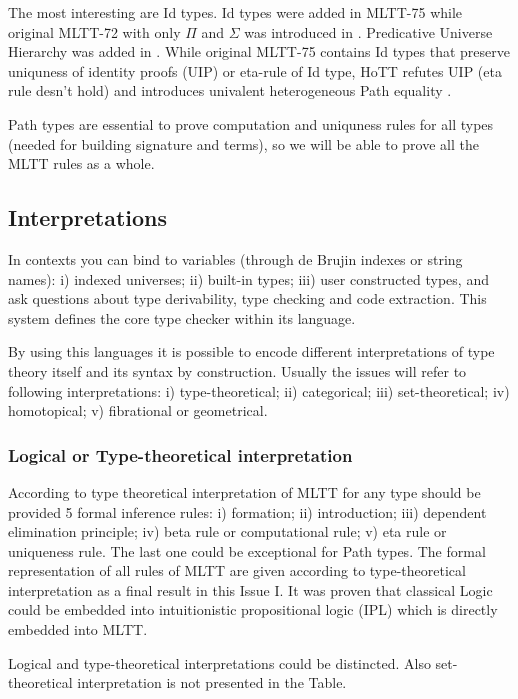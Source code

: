 \documentclass{article}
\theoremstyle{definition}
\begin{document}
The most interesting are Id types. Id types were added in MLTT-75 \cite{Lof84} while original MLTT-72
with only $\Pi$ and $\Sigma$ was introduced in \cite{Lof72}.
Predicative Universe Hierarchy was added in \cite{Lof75}.
While original MLTT-75 contains Id types that preserve uniquness of identity
proofs (UIP) or eta-rule of Id type, HoTT refutes UIP (eta rule desn't hold)
and introduces univalent heterogeneous Path equality \cite{Hofmann96}.

Path types are essential to prove computation and uniquness rules for all types
(needed for building signature and terms), so we will be able to prove all
the MLTT rules as a whole.

\subsection{Interpretations}

In contexts you can bind to variables (through de Brujin indexes or string names):
i) indexed universes; ii) built-in types; iii) user constructed types, and ask
questions about type derivability, type checking and code extraction. This system
defines the core type checker within its language.

By using this languages it is possible to encode different interpretations of
type theory itself and its syntax by construction. Usually the issues will refer to
following interpretations: i) type-theoretical; ii) categorical;
iii) set-theoretical; iv) homotopical; v) fibrational or geometrical.

\subsubsection{Logical or Type-theoretical interpretation}

According to type theoretical interpretation of MLTT for any type should be provided 5 formal
inference rules: i) formation; ii) introduction; iii) dependent elimination principle;
iv) beta rule or computational rule; v) eta rule or uniqueness rule. The last one could
be exceptional for Path types. The formal representation of all rules of MLTT
are given according to type-theoretical interpretation as a final result in this Issue I.
It was proven that classical Logic could be embedded into
intuitionistic propositional logic (IPL) which is directly embedded into MLTT.

Logical and type-theoretical interpretations could be distincted. Also
set-theoretical interpretation is not presented in the Table.
\end{document}
